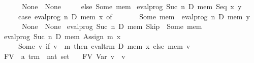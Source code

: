 \begin{isabellebody}
\ \ \ \ \ {}\ None\ {}\ None\isanewline
\ \ \ \ \ else\ Some\ mem{}{}\isanewline
{}\ {}eval{}prog\ {}Suc\ n{}\ D\ mem\ {}Seq\ x\ y{}\ {}\isanewline
\ \ \ \ \ {}case\ eval{}prog\ n\ D\ mem\ x\ of\isanewline
\ \ \ \ \ \ \ Some\ mem{}\ {}\ eval{}prog\ n\ D\ mem{}\ y\isanewline
\ \ \ \ \ {}\ None\ {}\ None{}{}\isanewline
{}\ {}eval{}prog\ {}Suc\ n{}\ D\ mem\ Skip\ {}\ Some\ mem{}\isanewline
{}\ {}eval{}prog\ {}Suc\ n{}\ D\ mem\ {}Assign\ m\ x{}\ {}\isanewline
\ \ \ \ \ {}Some\ {}{}v{}\ if\ v\ {}\ m\ then\ eval{}trm\ D\ mem\ x\ else\ mem\ v{}{}{}\isanewline
\isanewline
\isanewline
\isanewline
{}\isamarkupfalse%
\ FV\ {}{}\ {}{}a\ trm\ {}\ nat\ set{}\ \isanewline
\ \ {}FV\ {}Var\ v{}\ {}\ {}v{}{}\isanewline

\end{isabellebody}
